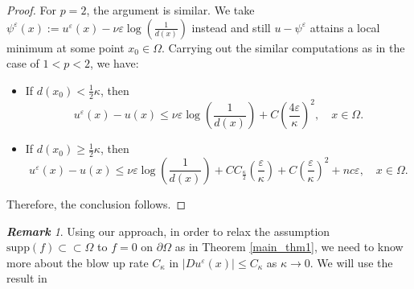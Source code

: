 \documentclass[12pt,reqno]{amsart}
\numberwithin{figure}{section}
\theoremstyle{plain}
\theoremstyle{remark}
\newtheorem{rem}{\bf{Remark}}
\numberwithin{equation}{section}
\begin{document}
\begin{proof}
For $p = 2$, the argument is similar. We take $\psi^\varepsilon(x):=u^\varepsilon(x)-\nu \varepsilon \log \left(\frac{1}{d(x)}\right)$ instead and still $u-\psi^\varepsilon$ attains a local minimum at some point $x_0 \in \Omega$. Carrying out the similar computations as in the case of $1 < p < 2$, we have:
\begin{itemize}
    \item If $\displaystyle d(x_0) < \frac{1}{2} \kappa$, then
    \begin{equation*}
        u^\varepsilon(x)-u(x) \leq \nu \varepsilon \log \left( \frac{1}{d(x)} \right) + C\left( \frac{4\varepsilon}{\kappa}\right)^2, \quad x \in \Omega.
    \end{equation*}
    \item If $\displaystyle d(x_0) \geq \frac{1}{2} \kappa$, then
    \begin{equation*}
        u^\varepsilon(x)-u(x) \leq \nu \varepsilon \log\left(\frac{1}{d(x)}\right) + 
        C C_\frac{\kappa}{2} \left( \frac{\varepsilon}{\kappa} \right) + C \left( \frac{\varepsilon}{\kappa} \right)^2 + nc\varepsilon, \quad x \in \Omega.
    \end{equation*}
\end{itemize}
Therefore, the conclusion follows.
\end{proof}

\begin{rem} Using our approach, in order to relax the assumption $\mathrm{supp}(f)\subset\subset\Omega$ to $f = 0$ on $\partial\Omega$ as in Theorem \ref{main_thm1}, we need to know more about the blow up rate $C_\kappa$ in $|Du^\varepsilon(x)|\leq C_\kappa$ as $\kappa\to 0$. We will use the result in 

\end{rem}
\end{document}
